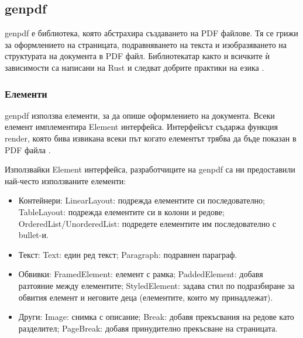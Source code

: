 \subsection{genpdf}
genpdf е библиотека, която абстрахира създаването на PDF файлове. Тя се грижи за
оформлението на страницата, подравняването на текста и изобразяването на
структурата на документа в PDF файл. Библиотекатар както и всичките ѝ зависимости
са написани на Rust и следват добрите практики на езика
\cite{genpdf_repository}.

\subsubsection{Елементи}
genpdf използва елементи, за да опише оформлението на документа. Всеки елемент
имплементира Element интерфейса. Интерфейсът съдаржа функция render, която бива
извикана всеки път когато елементът трябва да бъде показан в PDF файла
\cite{genpdf_element_trait}.

Използвайки Element интерфейса, разработчиците на genpdf са ни предоставили
най-често използваните елементи:
\begin{itemize}
    \item Контейнери:
        \subitem LinearLayout: подрежда елементите си последователно;
        \subitem TableLayout: подрежда елементите си в колони и редове;
        \subitem OrderedList/UnorderedList: подредете елементите им последователно с bullet-и.
    \item Текст:
        \subitem Text: един ред текст;
        \subitem Paragraph: подравнен параграф.
    \item Обвивки:
        \subitem FramedElement: елемент с рамка;
        \subitem PaddedElement: добавя разтояние между елементите;
        \subitem StyledElement: задава стил по подразбиране за обвития елемент и неговите деца (елементите, които му принадлежат).
    \item Други:
        \subitem Image: снимка с описание;
        \subitem Break: добавя прекъсвания на редове като разделител;
        \subitem PageBreak: добавя принудително прекъсване на страницата.
\end{itemize}
